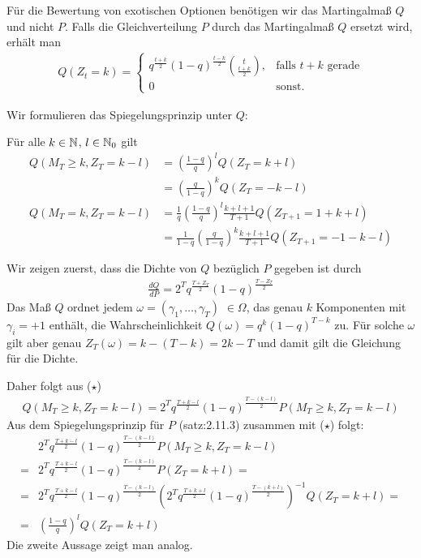\documentclass[a4paper,twoside,DIV15,BCOR12mm]{scrbook}
\begin{document}
Für die Bewertung von exotischen Optionen benötigen wir das Martingalmaß $Q$ und nicht $P$. Falls die Gleichverteilung $P$ durch das Martingalmaß $Q$ ersetzt wird, erhält man
\begin{align*}
Q(Z_t = k ) =
\begin{cases}
q^{\frac{t+k}2} (1-q)^{\frac{t-k}2} \binom{t}{\frac{t+k}2}, &\text{falls $t+k$ gerade}\\
0 &\text{sonst.}
\end{cases}
\end{align*}

Wir formulieren das Spiegelungsprinzip unter $Q$:

\begin{satz}
\label{satz:2.11.4}
Für alle $k\in \mathbb{N}$, $l\in\mathbb{N}_0$ gilt
\begin{align*}
Q(M_T\ge k, Z_T=k-l)&=\left(\frac{1-q}{q}\right)^l Q(Z_T=k+l)  \\
&=\left(\frac{q}{1-q}\right)^k Q(Z_T=-k-l)\\
Q(M_T=k,Z_T=k-l)&=\frac{1}{q} \left(\frac{1-q}{q}\right)^l \frac{k+l+1}{T+1} Q(Z_{T+1}=1+k+l)\\
&=\frac{1}{1-q} \left(\frac{q}{1-q}\right)^k \frac{k+l+1}{T+1} Q(Z_{T+1}=-1-k-l)
\end{align*}
\end{satz}
\begin{beweis}
Wir zeigen zuerst, dass die Dichte von $Q$ bezüglich $P$ gegeben ist durch 
\begin{align*}
\frac{dQ}{dP}=2^T q^{\frac{T+Z_T}{2}}(1-q)^{\frac{T-Z_T}{2}} \tag{$\star$}
 \end{align*}
Das Maß $Q$ ordnet jedem $\omega=(\gamma_1,\ldots,\gamma_T)$ $\in\Omega$, das genau $k$ Komponenten mit $\gamma_i=+1$ enthält, die Wahrscheinlichkeit $Q(\omega)=q^k(1-q)^{T-k}$ zu. Für solche $\omega$ gilt aber genau $Z_T(\omega)=k-(T-k)=2k-T$ und damit gilt die Gleichung für die Dichte.

Daher folgt aus ($\star$) 
\begin{align*}
Q(M_T\ge k,Z_T=k-l)=2^T q^{\frac{T+k-l}{2}}(1-q)^{\frac{T-(k-l)}{2}}P(M_T\ge k,Z_T=k-l)
\end{align*} 
Aus dem Spiegelungsprinzip für $P$ (satz:2.11.3) zusammen mit ($\star$) folgt:
\begin{align*}
&2^T q^{\frac{T+k-l}{2}}(1-q)^{\frac{T-(k-l)}{2}}P(M_T\ge k,Z_T=k-l)\\
=& 2^T q^{\frac{T+k-l}{2}}(1-q)^{\frac{T-(k-l)}{2}}P(Z_T=k+l)=\\
=&2^T q^{\frac{T+k-l}{2}}(1-q)^{\frac{T-(k-l)}{2}}(2^T q^{\frac{T+k+l}{2}}(1-q)^{\frac{T-(k+l)}{2}})^{-1}Q(Z_T=k+l)=\\
=&\left(\frac{1-q}{q}\right)^l Q(Z_T=k+l)
\end{align*}
Die zweite Aussage zeigt man analog.
\end{beweis}
\end{document}
